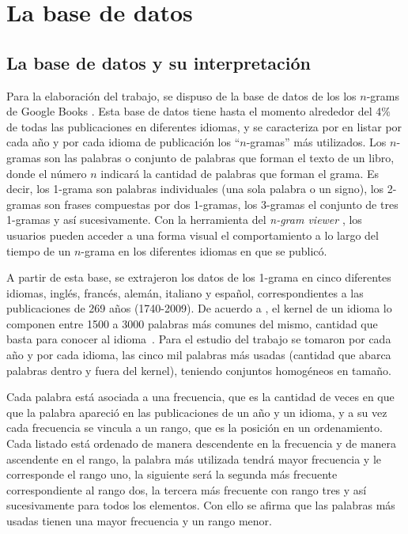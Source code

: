 \chapter{La base de datos}


\section{La base de datos y su interpretación} %

Para la elaboración del trabajo,  se dispuso de la base de datos de los los
$n$-grams de Google Books  \cite{ngramv} . Esta base de datos
tiene hasta el momento alrededor del 4$\%$ de todas las publicaciones en
diferentes idiomas,  y se caracteriza por en listar  por cada año y por cada
idioma de publicación los ``$n$-gramas''  más utilizados.   Los $n$-gramas son
las palabras o conjunto de palabras que forman el texto de un libro, donde el
número $n$ indicará la cantidad de palabras que forman el grama.  Es decir, los
1-grama son palabras individuales (una sola palabra o un signo), los 2-gramas
son frases compuestas por dos 1-gramas, los 3-gramas el conjunto de tres 1-gramas
y así sucesivamente.   Con la herramienta del \textit{n-gram viewer}
\cite{ngramv}, los usuarios pueden acceder a una forma visual el comportamiento
a lo largo del tiempo de un $n$-grama en los diferentes idiomas en que se
publicó.  

A partir de esta base, se extrajeron los datos de los 1-grama en cinco
diferentes idiomas, inglés, francés, alemán, italiano y español,
correspondientes a las publicaciones de 269 años (1740-2009).  De acuerdo a
\cite{languagesascool},  el kernel de un idioma lo componen entre 1500 a 3000 palabras
más comunes del mismo,  cantidad que basta para conocer al idioma~.  Para el
estudio del trabajo se tomaron por cada año y por cada idioma,  las cinco mil
palabras más usadas (cantidad que abarca palabras dentro y fuera del kernel),
teniendo conjuntos homogéneos en tamaño.

Cada palabra está asociada a una frecuencia, que es la cantidad de veces en que
que la  palabra apareció en las publicaciones de un año y un idioma, y a su vez
cada frecuencia se vincula a un rango, que es la posición en un ordenamiento.
Cada listado está ordenado de manera descendente en la frecuencia y de manera
ascendente en el rango, la palabra más utilizada tendrá mayor frecuencia y le
corresponde el rango uno,  la siguiente será la segunda más frecuente
correspondiente al rango dos,  la tercera más frecuente con rango tres y así
sucesivamente para todos los elementos.  Con ello se afirma que las palabras
más usadas tienen una mayor frecuencia y un rango menor. 

